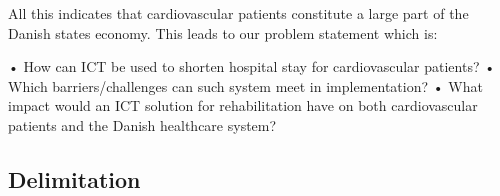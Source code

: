 All this indicates that cardiovascular patients constitute a large part of the Danish states economy. This leads to our problem statement which is:

•	How can ICT be used to shorten hospital stay for cardiovascular patients?
•	Which barriers/challenges can such system meet in implementation?
•	What impact would an ICT solution for rehabilitation have on both cardiovascular patients and the Danish healthcare system?


\subsection{Delimitation}
      

